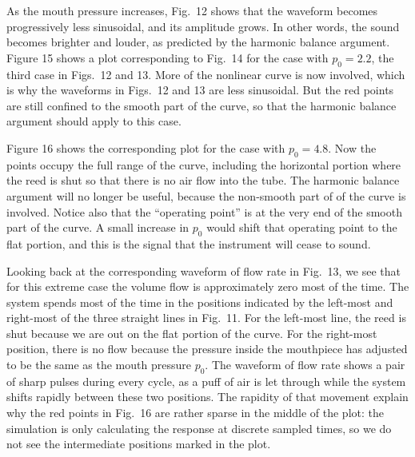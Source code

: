   As the mouth pressure increases, Fig.\ 12 shows that the waveform becomes 
  progressively less sinusoidal, and its amplitude grows. In other words, the 
  sound becomes brighter and louder, as predicted by the harmonic balance 
  argument. Figure 15 shows a plot corresponding to Fig.\ 14 for the case with 
  $p_0=2.2$, the third case in Figs.\ 12 and 13. More of the nonlinear curve is 
  now involved, which is why the waveforms in Figs.\ 12 and 13 are less 
  sinusoidal. But the red points are still confined to the smooth part of the 
  curve, so that the harmonic balance argument should apply to this case. 


  Figure 16 shows the corresponding plot for the case with $p_0=4.8$. Now the 
  points occupy the full range of the curve, including the horizontal portion 
  where the reed is shut so that there is no air flow into the tube. The 
  harmonic balance argument will no longer be useful, because the non-smooth 
  part of of the curve is involved. Notice also that the ``operating point'' is 
  at the very end of the smooth part of the curve. A small increase in $p_0$ 
  would shift that operating point to the flat portion, and this is the signal 
  that the instrument will cease to sound. 


  Looking back at the corresponding waveform of flow rate in Fig.\ 13, we see 
  that for this extreme case the volume flow is approximately zero most of the 
  time. The system spends most of the time in the positions indicated by the 
  left-most and right-most of the three straight lines in Fig.\ 11. For the 
  left-most line, the reed is shut because we are out on the flat portion of 
  the curve. For the right-most position, there is no flow because the pressure 
  inside the mouthpiece has adjusted to be the same as the mouth pressure 
  $p_0$. The waveform of flow rate shows a pair of sharp pulses during every 
  cycle, as a puff of air is let through while the system shifts rapidly 
  between these two positions. The rapidity of that movement explain why the 
  red points in Fig.\ 16 are rather sparse in the middle of the plot: the 
  simulation is only calculating the response at discrete sampled times, so we 
  do not see the intermediate positions marked in the plot. 

